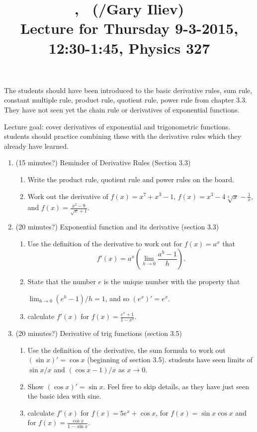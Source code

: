 \documentclass[12pt]{amsart}
\title{\course, \semester\ (\instructor/Gary Iliev) \\ Lecture for Thursday
9-3-2015, 12:30-1:45, Physics 327}
\begin{document}
\maketitle
{\color{blue}The students should have been introduced to the basic
derivative rules, sum rule, constant multiple rule, product rule, quotient
rule, power rule from chapter 3.3. They have not seen yet the chain rule or
derivatives of exponential functions.}

Lecture goal: cover derivatives of exponential and trigonometric functions.
students should practice combining these with the derivative rules which
they already have learned.

\begin{enumerate}[1. ]
\setlength{\itemsep}{.3cm}
\item (15 minutes?)
Reminder of Derivative Rules (Section 3.3)
\begin{enumerate}[ i. ]
\item
Write the product rule, quotient rule and power rules on the board.
\item
Work out the derivative of $f(x) = x^7 + x^3 - 1$, $f(x) = x^3 - 4 \sqrt[3]
x - \frac 1x$, and $\displaystyle f(x) = \frac{x^2 - 9}{\sqrt x + 1}$.
\end{enumerate}

\item (20 minutes?)
Exponential function and its derivative (section 3.3)
\begin{enumerate}[ i. ]
\item
Use the definition of the derivative to work out for $f(x) = a^x$ that
$$\displaystyle f'(x) = a^x \left(\lim_{h \to 0} \frac{a^h -
1}{h}\right).$$
\item
State that the number $e$ is the unique number with the property that

$\lim_{h \to 0} (e^h - 1)/h = 1$, and so $(e^x)' = e^x$.
\item
calculate $f'(x)$ for $f(x) = \frac{e^x + 1}{1 - x^2}$.
\end{enumerate}

\item (20 minutes?)
Derivative of trig functions (section 3.5)
\begin{enumerate}[ i. ]
\item
Use the definition of the derivative, the sum formula to work out $(\sin x)'
= \cos x$ (beginning of section 3.5). students have seen limits of $\sin x
/ x$ and $(\cos x - 1)/x$ as $x \to 0$. 
\item
Show $(\cos x)' = \sin x$. Feel free to skip details, as they have just
seen the basic idea with sine.
\item
calculate $f'(x)$ for $f(x) = 5 e^x + \cos x$, for $f(x) = \sin x \cos x$
and for $\displaystyle f(x) = \frac{\cos x}{1 - \sin x}$. 
\end{enumerate}


\end{enumerate}
\end{document}
